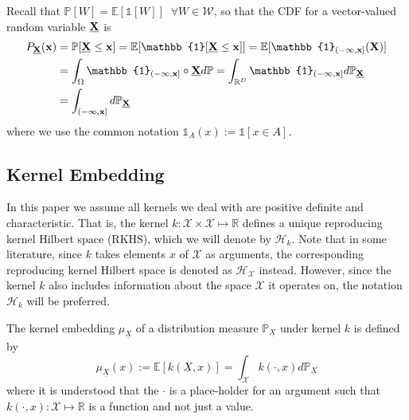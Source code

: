 \documentclass[twoside]{article} \usepackage{aistats2017}
\theoremstyle{definition}
\theoremstyle{remark}
\newcommand{\rv}[1]{\underline{#1}}
\newcommand{\extra}[1]{{\color{ForestGreen} #1}}
\begin{document}
		Recall that $\mathbb{P}[W] = \mathbb{E}[\mathbb{1}[W]] \;\; \forall W \in \mathcal{W}$, so that the CDF for a vector-valued random variable $\bvec{\rv{X}}$ is
		\begin{equation}
			\begin{aligned}
				P_{\bvec{\rv{X}}}(\bvec{x}) &= \mathbb{P}[\bvec{\rv{X}} \leq \bvec{x}] = \mathbb{E}[\mathbb{1}[\bvec{\rv{X}} \leq \bvec{x}]] = \mathbb{E}[\mathbb{1}_{(-\bvec{\infty}, \bvec{x}]}(\bvec{X})] \\
				&= \int_{\Omega} \mathbb{1}_{(-\bvec{\infty}, \bvec{x}]} \circ \bvec{\rv{X}} d \mathbb{P} = \int_{\mathbb{R}^{D}} \mathbb{1}_{(-\bvec{\infty}, \bvec{x}]} d \mathbb{P}_{\bvec{\rv{X}}} \\
				&= \int_{(-\bvec{\infty}, \bvec{x}]} d \mathbb{P}_{\bvec{\rv{X}}}
			\end{aligned}
		\label{eq:cdf_integral}
		\end{equation}
		where we use the common notation $\mathbb{1}_{A}(x) := \mathbb{1}[x \in A]$.
		
	\subsection{Kernel Embedding}
	\label{sec:background:kernel_embedding}
	
		In this paper we assume all kernels we deal with are positive definite and characteristic. That is, the kernel $k : \mathcal{X} \times \mathcal{X} \mapsto \mathbb{R}$ defines a unique reproducing kernel Hilbert space (RKHS), which we will denote by $\mathcal{H}_{k}$. \extra{Note that in some literature, since $k$ takes elements $x$ of $\mathcal{X}$ as arguments, the corresponding reproducing kernel Hilbert space is denoted as $\mathcal{H}_{\mathcal{X}}$ instead. However, since the kernel $k$ also includes information about the space $\mathcal{X}$ it operates on, the notation $\mathcal{H}_{k}$ will be preferred.}
		 
		The kernel embedding $\mu_{\rv{X}}$ of a distribution measure $\mathbb{P}_{\rv{X}}$ under kernel $k$ is defined by
		\begin{equation}
			\mu_{\rv{X}}(x) := \mathbb{E}[k(\rv{X}, x)] = \int_{\mathcal{X}} k(\cdot, x) d \mathbb{P}_{\rv{X}}
		\label{eq:basic_embedding}
		\end{equation}
		\extra{where it is understood that the $\cdot$ is a place-holder for an argument such that $k(\cdot, x) : \mathcal{X} \mapsto \mathbb{R}$ is a function and not just a value.}
		
\end{document}
